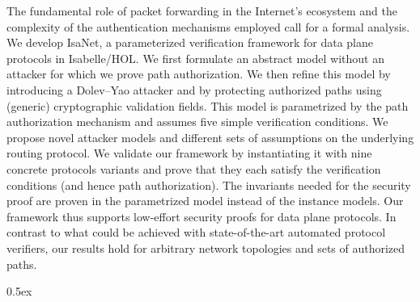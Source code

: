 \documentclass[11pt,a4paper]{report}
\begin{document}
The fundamental role of packet forwarding in the Internet's ecosystem and the complexity of the authentication mechanisms employed call for a formal analysis.
We develop IsaNet, a parameterized verification framework for data plane protocols in Isabelle/HOL. We first formulate an abstract model without an attacker for which we prove path authorization. We then refine this model by introducing a Dolev--Yao attacker and by protecting authorized paths using (generic) cryptographic validation fields. This model is parametrized by the path authorization mechanism and assumes five simple verification conditions.
We propose novel attacker models and different sets of assumptions on the underlying routing protocol.
We validate our framework by instantiating it with nine concrete protocols variants and prove that they each satisfy the verification conditions (and hence path authorization). 
The invariants needed for the security proof are proven in the parametrized model instead of the instance models. Our framework thus supports low-effort security proofs for data plane protocols. 
In contrast to what could be achieved with state-of-the-art automated protocol verifiers, our results hold for arbitrary network topologies and sets of authorized paths.


\parindent 0pt\parskip 0.5ex





%
%
\end{document}
